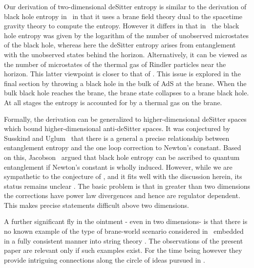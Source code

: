 Our derivation of two-dimensional deSitter entropy 
is similar to the derivation of black hole entropy
in \ascv\ in that it uses a brane field theory dual to the
spacetime gravity theory to compute the entropy. However it
differs in that in \ascv\ the black hole entropy was given by the
logarithm of the number of unobserved microstates of the black hole, 
whereas here the deSitter entropy arises from
entanglement with the unobserved states behind the
horizon. Alternatively, it can be viewed as the number 
of microstates of the thermal 
gas of Rindler particles  near the horizon.  This latter viewpoint is 
closer to that of \ascv.  This issue is 
explored  in the final section by throwing a 
black hole in the bulk of AdS at the brane. When the bulk black
hole reaches the brane, the brane state collapses to a brane black hole. 
At all stages the entropy is accounted for 
by a thermal gas on the brane. 
 

Formally, the derivation can be generalized to higher-dimensional 
deSitter spaces which bound higher-dimensional anti-deSitter spaces. 
It was conjectured by Susskind and Uglum 
\su\ that there is a general a precise relationship 
between entanglement entropy and the one loop correction to Newton's
constant. Based on this, Jacobson \tj\ argued that black hole
entropy can be ascribed to quantum entanglement if
Newton's constant is wholly induced. However, 
while we are sympathetic to the conjecture of \su, and it fits well 
with the discussion herein, its status remains unclear . 
The basic problem is that in greater than two dimensions the 
corrections have power law divergences and hence are regulator 
dependent. This makes precise statements difficult above two dimensions.    

A further 
significant fly in the ointment - even in two dimensions- is that there is no
known example of the type of brane-world scenario considered in
\rs\
embedded in a fully consistent manner into string theory .
The observations of the present paper are relevant only
if such examples exist. For the time being however they provide
intriguing connections along the circle of ideas pursued in
.






